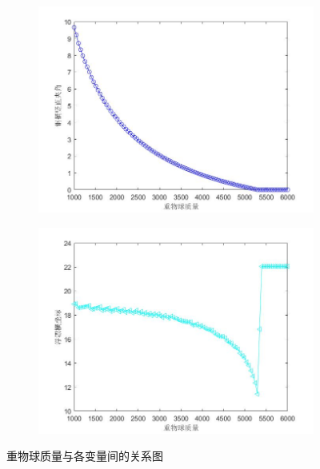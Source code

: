 \begin{figure}[H]
\begin{subfigure}[b]{0.4\textwidth}
                    \caption{}
                    \label{fig:锚链底端水平夹角随重物球质量变化曲线}
                \end{subfigure}
                \centering
                \begin{subfigure}[b]{0.4\textwidth}
                    \includegraphics[width=\textwidth]{images/alpha1_m+.jpg}
                    \caption{}
                    \label{fig:钢桶竖直夹角随重物球质量变化曲线}
                \end{subfigure}
                \begin{subfigure}[b]{0.4\textwidth}
                    \includegraphics[width=\textwidth]{images/x0_m+.jpg}
                    \caption{}
                    \label{fig:浮漂横坐标随重物球质量变化曲线}
                \end{subfigure}
                \caption{重物球质量与各变量间的关系图}
                \label{重物球质量与各变量间的关系图}
            \end{figure}
